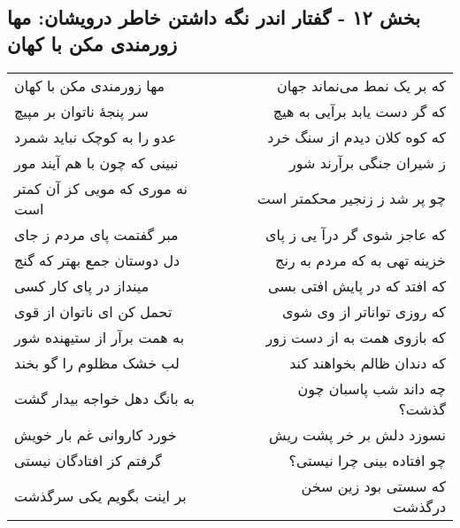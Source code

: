 \begin{center}
\section*{بخش ۱۲ - گفتار اندر نگه داشتن خاطر درویشان: مها زورمندی مکن با کهان}
\label{sec:012}
\begin{longtable}{l p{0.5cm} r}
مها زورمندی مکن با کهان
&&
که بر یک نمط می‌نماند جهان
\\
سر پنجهٔ ناتوان بر مپیچ
&&
که گر دست یابد برآیی به هیچ
\\
عدو را به کوچک نباید شمرد
&&
که کوه کلان دیدم از سنگ خرد
\\
نبینی که چون با هم آیند مور
&&
ز شیران جنگی برآرند شور
\\
نه موری که مویی کز آن کمتر است
&&
چو پر شد ز زنجیر محکمتر است
\\
مبر گفتمت پای مردم ز جای
&&
که عاجز شوی گر درآ یی ز پای
\\
دل دوستان جمع بهتر که گنج
&&
خزینه تهی به که مردم به رنج
\\
مینداز در پای کار کسی
&&
که افتد که در پایش افتی بسی
\\
تحمل کن ای ناتوان از قوی
&&
که روزی تواناتر از وی شوی
\\
به همت برآر از ستیهنده شور
&&
که بازوی همت به از دست زور
\\
لب خشک مظلوم را گو بخند
&&
که دندان ظالم بخواهند کند
\\
به بانگ دهل خواجه بیدار گشت
&&
چه داند شب پاسبان چون گذشت؟
\\
خورد کاروانی غم بار خویش
&&
نسوزد دلش بر خر پشت ریش
\\
گرفتم کز افتادگان نیستی
&&
چو افتاده بینی چرا نیستی؟
\\
بر اینت بگویم یکی سرگذشت
&&
که سستی بود زین سخن درگذشت
\\
\end{longtable}
\end{center}
